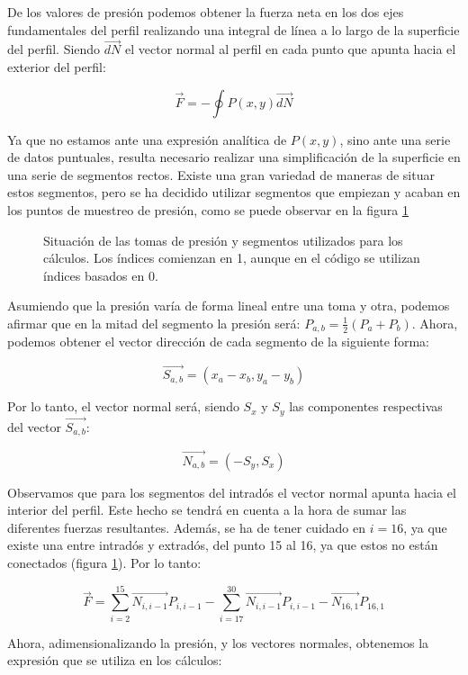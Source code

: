 \documentclass{article}
\begin{document}
De los valores de presión podemos obtener la fuerza neta en los dos ejes fundamentales del perfil realizando una integral
de línea a lo largo de la superficie del perfil. Siendo $\vec{dN}$ el vector normal al perfil en cada punto que apunta hacia
el exterior del perfil:

$$\vec{F} = - \oint P(x, y) \vec{dN}$$ 

Ya que no estamos ante una expresión analítica de $P(x, y)$, sino ante una serie de datos puntuales, resulta necesario realizar
una simplificación de la superficie en una serie de segmentos rectos. Existe una gran variedad de maneras de situar estos 
segmentos, pero se ha decidido utilizar segmentos que empiezan y acaban en los puntos de muestreo de presión, como se puede 
observar en la figura \ref{fig:NACA}

\begin{figure}[h!]
    
    \caption{Situación de las tomas de presión y segmentos utilizados para los cálculos. Los índices comienzan en 1,
    aunque en el código se utilizan índices basados en 0.}
    \label{fig:NACA}    
\end{figure}

Asumiendo que la presión varía de forma lineal entre una toma y otra, podemos afirmar que en la mitad del segmento la presión 
será: $P_{a, b} = \frac{1}{2}(P_{a} + P_{b})$. Ahora, podemos obtener el vector dirección de cada segmento de la 
siguiente forma:

$$\vec{S_{a,b}} = (x_{a} - x_{b}, y_{a} - y_{b})$$

Por lo tanto, el vector normal será, siendo $S_x$ y $S_y$ las componentes respectivas del vector $\vec{S_{a,b}}$:

$$\vec{N_{a, b}} = (-S_y, S_x)$$

Observamos que para los segmentos del intradós el vector normal apunta hacia el interior del perfil. Este hecho se tendrá
en cuenta a la hora de sumar las diferentes fuerzas resultantes. Además, se ha de tener cuidado en $i=16$, ya que existe 
una  entre intradós y extradós, del punto 15 al 16, ya que estos no están conectados (figura \ref{fig:NACA}). Por lo tanto:

$$\vec{F} = 
\sum_{i = 2}^{15} \vec{N_{i, i-1}} P_{i, i-1} - 
\sum_{i=17}^{30} \vec{N_{i, i-1}} P_{i, i-1} -
\vec{N_{16, 1}} P_{16, 1} $$

Ahora, adimensionalizando la presión, y los vectores normales, obtenemos la expresión que se utiliza en los cálculos:
\end{document}
